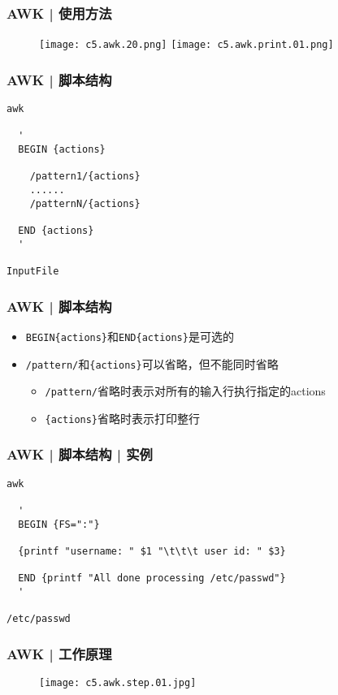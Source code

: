 \begin{frame}[fragile]
  \frametitle{AWK | 使用方法}
  \begin{figure}
    \centering
    \texttt{[image: c5.awk.20.png]}
    \vspace{0.5cm}
    \texttt{[image: c5.awk.print.01.png]}
  \end{figure}
\end{frame}

\begin{frame}[fragile]
  \frametitle{AWK | \alert{脚本结构}}
\begin{lstlisting}
awk

  '
  BEGIN {actions}

    /pattern1/{actions}
    ......
    /patternN/{actions}

  END {actions}
  '

InputFile
\end{lstlisting}
\end{frame}

\begin{frame}[fragile]
  \frametitle{AWK | 脚本结构}
  \begin{itemize}
    \item \verb|BEGIN{actions}|和\verb|END{actions}|是可选的
    \item \verb|/pattern/|和\verb|{actions}|可以省略，但不能同时省略
      \begin{itemize}
        \item \verb|/pattern/|省略时表示对所有的输入行执行指定的actions
        \item \verb|{actions}|省略时表示打印整行
      \end{itemize}
  \end{itemize}
\end{frame}

\begin{frame}[fragile,label=example]
  \frametitle{AWK | 脚本结构 | 实例}
\begin{lstlisting}
awk

  '
  BEGIN {FS=":"}

  {printf "username: " $1 "\t\t\t user id: " $3}

  END {printf "All done processing /etc/passwd"}
  '

/etc/passwd
\end{lstlisting}
\end{frame}


\begin{frame}
  \frametitle{AWK | \alert{工作原理}}
  \begin{figure}
    \centering
    \texttt{[image: c5.awk.step.01.jpg]}
  \end{figure}
\end{frame}

